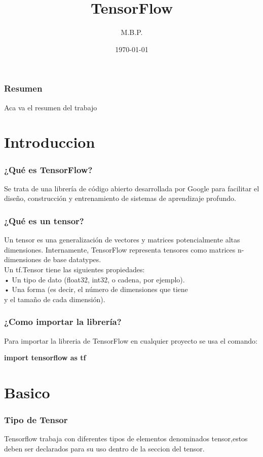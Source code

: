 \documentclass{beamer}
\begin{document}
\title{TensorFlow}
\author{M.B.P.}
\date{\today}
\maketitle

\newpage
\begin{frame}\frametitle{Resumen}
Aca va el resumen del trabajo
\end{frame}

\newpage
\section{Introduccion}
\begin{frame}\frametitle{¿Qué es TensorFlow?} 
Se trata de una librería de código abierto desarrollada por Google
para facilitar el diseño, construcción y entrenamiento de sistemas
de aprendizaje profundo.
\end{frame}

\newpage
\begin{frame}\frametitle{¿Qué es un tensor?} 
Un tensor es una generalización de vectores y matrices
potencialmente altas dimensiones. Internamente, TensorFlow
representa tensores como matrices n-dimensiones de base
datatypes.\\
\vspace{5mm}
Un tf.Tensor tiene las siguientes propiedades:\\
\vspace{5mm}
• Un tipo de dato (float32, int32, o cadena, por ejemplo).\\
• Una forma (es decir, el número de dimensiones que tiene\\
\hspace{4mm}y el tamaño de cada dimensión).\\
\end{frame}

\newpage
\begin{frame}\frametitle{¿Como importar la librería?} 
Para importar la libreria de TensorFlow en cualquier proyecto se
usa el comando:

\begin{center}
\textbf{import tensorflow as tf}
\end{center}

\end{frame}

\newpage
\section{Basico}
\begin{frame}\frametitle{Tipo de Tensor}
Tensorflow trabaja con diferentes tipos de elementos denominados
tensor,estos deben ser declarados para su uso dentro de la seccion
del tensor.
\end{frame}
\end{document}
